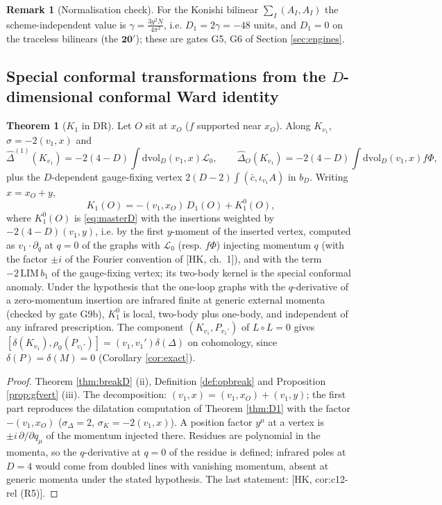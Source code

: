 \documentclass[11pt]{article}
\theoremstyle{definition}
\newtheorem{theorem}[definition]{Theorem}
\newtheorem{remark}[definition]{Remark}
\numberwithin{equation}{section}
\begin{document}
\begin{remark}[Normalisation check]
For the Konishi bilinear $\sum_I(A_I,A_I)$ the scheme-independent value is $\gamma=\frac{3g^2N}{4\pi^2}$, i.e. $D_1=2\gamma=-48$ units, and $D_1=0$ on the traceless bilinears (the $\mathbf{20}'$); these are gates G5, G6 of Section \ref{sec:engines}.
\end{remark}

\subsection{Special conformal transformations from the \texorpdfstring{$D$}{D}-dimensional conformal Ward identity}

\begin{theorem}[$K_1$ in DR]
\label{thm:K1}
Let $O$ sit at $x_O$ ($f$ supported near $x_O$). Along $K_{v_1}$, $\sigma=-2(v_1,x)$ and
\[
\widehat\Delta^{(1)}(K_{v_1})=-2(4-D)\int\mathrm{dvol}_D(v_1,x)\mathscr L_0,\qquad \widehat\Delta_O(K_{v_1})=-2(4-D)\int\mathrm{dvol}_D(v_1,x)f\Phi,
\]
plus the $D$-dependent gauge-fixing vertex $2(D-2)\int(\bar c,\iota_{v_1}A)$ in $b_D$. Writing $x=x_O+y$,
\[
K_1(O)=-(v_1,x_O)\,D_1(O)+K^0_1(O),
\]
where $K^0_1(O)$ is \eqref{eq:masterD} with the insertions weighted by $-2(4-D)(v_1,y)$, i.e. by the first $y$-moment of the inserted vertex, computed as $v_1\cdot\partial_q$ at $q=0$ of the graphs with $\mathscr L_0$ (resp. $f\Phi$) injecting momentum $q$ (with the factor $\pm i$ of the Fourier convention of [HK, ch.~1]), and with the term $-2\,\mathrm{LIM}\,b_1$ of the gauge-fixing vertex; its two-body kernel is the special conformal anomaly. Under the hypothesis that the one-loop graphs with the $q$-derivative of a zero-momentum insertion are infrared finite at generic external momenta (checked by gate G9b), $K^0_1$ is local, two-body plus one-body, and independent of any infrared prescription. The component $(K_{v_1},P_{v_1'})$ of $L\circ L=0$ gives $[\delta(K_{v_1}),\rho_0(P_{v_1'})]=(v_1,v_1')\delta(\Delta)$ on cohomology, since $\delta(P)=\delta(M)=0$ (Corollary \ref{cor:exact}).
\end{theorem}

\begin{proof}
Theorem \ref{thm:breakD} (ii), Definition \ref{def:opbreak} and Proposition \ref{prop:gfvert} (iii). The decomposition: $(v_1,x)=(v_1,x_O)+(v_1,y)$; the first part reproduces the dilatation computation of Theorem \ref{thm:D1} with the factor $-(v_1,x_O)$ ($\sigma_\Delta=2$, $\sigma_K=-2(v_1,x)$). A position factor $y^\mu$ at a vertex is $\pm i\,\partial/\partial q_\mu$ of the momentum injected there. Residues are polynomial in the momenta, so the $q$-derivative at $q=0$ of the residue is defined; infrared poles at $D=4$ would come from doubled lines with vanishing momentum, absent at generic momenta under the stated hypothesis. The last statement: [HK, cor:c12-rel (R5)].
\end{proof}
\end{document}
